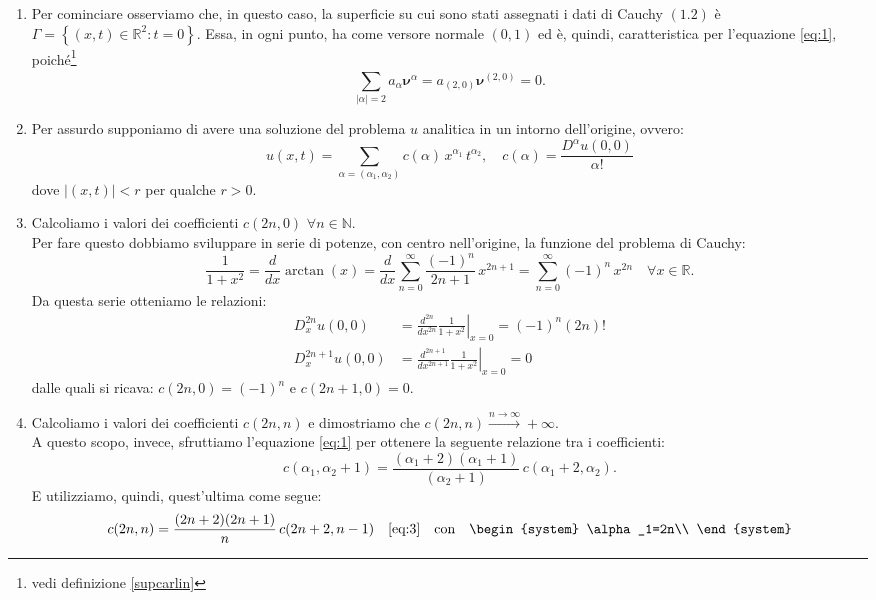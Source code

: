 \begin{enumerate}
\item
Per cominciare osserviamo che, in questo caso, la superficie su cui sono stati assegnati i dati di Cauchy $(1.2)$ è 
$\Gamma=\left\lbrace(x,t) \in \mathbb{R}^2:t=0\right\rbrace$. Essa, in ogni punto, ha come versore normale $(0,1)$ ed è, quindi,
caratteristica per l'equazione \eqref{eq:1}, poiché\footnote{vedi definizione \ref{supcarlin}}
$$\sum_{|\alpha|=2}^{\;} a_\alpha \boldsymbol{\nu}^\alpha = a_{(2,0)}\boldsymbol{\nu}^{(2,0)} = 0. $$
\item
Per assurdo supponiamo di avere una soluzione del problema $u$ analitica in un intorno dell'origine, ovvero:
$$u(x,t) = \sum_{\alpha = (\alpha_1, \alpha_2) }^{\;} c(\alpha) \, x^{\alpha_1} \, t ^{\alpha_2}, \quad
 c(\alpha) = \frac{D^\alpha u(0,0)}{\alpha!}$$
dove $|(x,t)|<r$ per qualche $r>0$.
\item
Calcoliamo i valori dei coefficienti $c(2n,0)$ $\forall n \in \mathbb{N}$.\\
Per fare questo dobbiamo sviluppare in serie di potenze, con centro nell'origine, la funzione del problema di Cauchy:
$$\frac{1}{1+x^2} = \frac{d}{dx}\arctan(x) = \frac{d}{dx}\sum_{n=0}^{\infty}\frac{(-1)^n}{2n+1} \, x^{2n+1} 
= \sum_{n=0}^{\infty}(-1)^n \, x^{2n} \quad \forall x \in \mathbb{R}.$$
Da questa serie otteniamo le relazioni:
\begin{align*}
D_x^{2n}u(0,0) &= \frac{d^{2n}}{dx^{2n}} \left. \frac{1}{1+x^2}\right|_{x=0} = (-1)^n (2n)!\\
D_x^{2n+1}u(0,0) &= \frac{d^{2n+1}}{dx^{2n+1}} \left. \frac{1}{1+x^2} \right|_{x=0} = 0
\end{align*} 
dalle quali si ricava: $c(2n,0)=(-1)^n$ e $c(2n+1,0)=0$.
\item
Calcoliamo i valori dei coefficienti $c(2n,n)$ e dimostriamo che  $c(2n,n) \xrightarrow{n\rightarrow\infty} +\infty$.\\
A questo scopo, invece, sfruttiamo l'equazione \eqref{eq:1} per ottenere la seguente relazione tra i coefficienti:
\begin{equation} 
\label{eq:3}
c(\alpha_1,\alpha_2+1) = \frac{(\alpha_1+2)(\alpha_1+1)}{(\alpha_2+1)} \, c(\alpha_1+2,\alpha_2).
\end{equation}
E utilizziamo, quindi, quest'ultima come segue:
\begin{align*}
c(2n,n) &= \frac{(2n+2)(2n+1)}{n} \, c(2n+2,n-1)   &\eqref{eq:3}\quad\text{con} \quad 
\begin{system}
\alpha_1=2n\\

\end{system}
\end{align*}
\end{enumerate}
